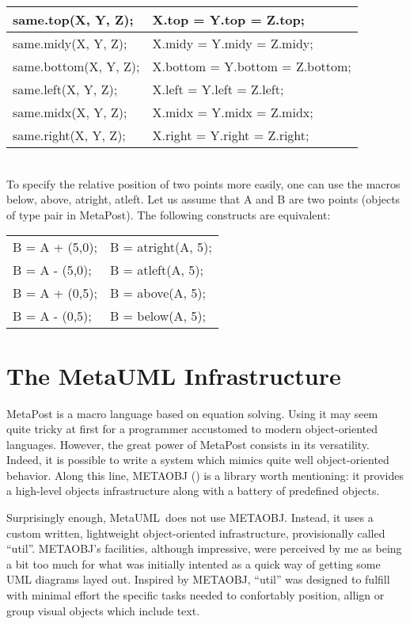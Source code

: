 \documentclass{article}
\newcommand{\code}{\ttfamily}
\newcommand{\metauml}{MetaUML}
\begin{document}
\begin{tabular}{||l|l||}
\hline
{\code same.top(X, Y, Z);} & {\code X.top = Y.top = Z.top;} \\
\hline
{\code same.midy(X, Y, Z);} & {\code X.midy = Y.midy = Z.midy;} \\
\hline
{\code same.bottom(X, Y, Z);} & {\code X.bottom = Y.bottom = Z.bottom;} \\
\hline
{\code same.left(X, Y, Z);} & {\code X.left = Y.left = Z.left;} \\
\hline
{\code same.midx(X, Y, Z);} & {\code X.midx = Y.midx = Z.midx;} \\
\hline
{\code same.right(X, Y, Z);} & {\code X.right = Y.right = Z.right;} \\
\hline
\end{tabular} \\


To specify the relative position of two points more easily, one can use the macros {\code below}, {\code above}, {\code atright}, {\code atleft}. Let us assume that {\code A} and {\code B} are two points (objects of type {\code pair} in MetaPost). The following constructs are equivalent:

\begin{tabular}{||l|l||}
\hline
{\code B = A + (5,0);} & {\code B = atright(A, 5);} \\
{\code B = A - (5,0);} & {\code B = atleft(A, 5);} \\
{\code B = A + (0,5);} & {\code B = above(A, 5);} \\
{\code B = A - (0,5);} & {\code B = below(A, 5);} \\
\hline
\end{tabular}


\section{The MetaUML Infrastructure}
\label{section:infrastructure}

MetaPost is a macro language based on equation solving. Using it may seem quite
tricky at first for a programmer accustomed to modern object-oriented languages.
However, the great power of MetaPost consists in its versatility. Indeed, it is possible to write
a system which mimics quite well object-oriented behavior. Along this line, METAOBJ
(\cite{metaobj}) is a library worth mentioning: it provides a high-level objects
infrastructure along with a battery of predefined objects.

Surprisingly enough, \metauml\ does not use METAOBJ. Instead, it uses a custom written,
lightweight object-oriented infrastructure, provisionally called ``{\code util}''.
METAOBJ's facilities, although impressive, were perceived by me as being a bit too much
for what was initially intented as a quick way of getting some UML diagrams layed out.
Inspired by METAOBJ, ``{\code util}'' was designed to fulfill with minimal effort
the specific tasks needed to confortably position, allign or group visual objects
which include text.
\end{document}
